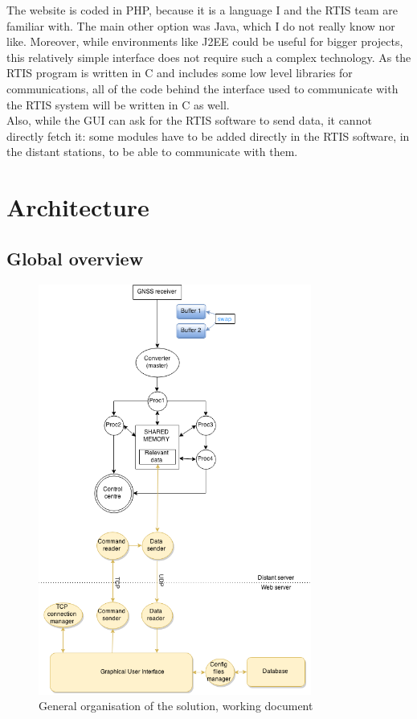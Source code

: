 \documentclass{themeensg}
\begin{document}
The website is coded in PHP, because it is a language I and the RTIS team are familiar with. The main other option was Java, which I do not really know nor like. Moreover, while environments like J2EE could be useful for bigger projects, this relatively simple interface does not require such a complex technology.
As the RTIS program is written in C and includes some low level libraries for communications, all of the code behind the interface used to communicate with the RTIS system will be written in C as well.\\

Also, while the GUI can ask for the RTIS software to send data, it cannot directly fetch it: some modules have to be added directly in the RTIS software, in the distant stations, to be able to communicate with them.

\section{Architecture}
\subsection{Global overview}

\begin{figure}[!h]
	\centering
	\includegraphics[width=0.8\textwidth]{global_flowchart}
	\caption{General organisation of the solution, working document}
	\label{generalOrganisation}
\end{figure}
\end{document}
